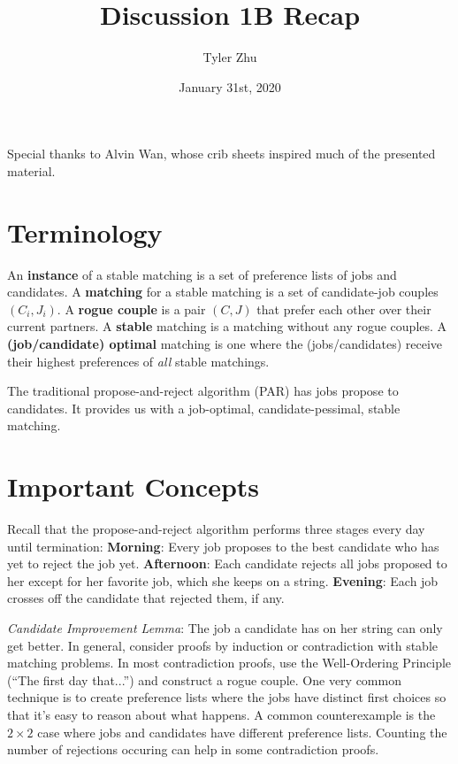 \documentclass[11 pt]{scrartcl}
\newcommand{\hwtitle}{Discussion 1B Recap}
\begin{document}
 
\title{\Large \hwtitle{}}
\author{\large Tyler Zhu}
\date{\large January 31st, 2020}

\maketitle 

Special thanks to Alvin Wan, whose crib sheets inspired much of the presented material.

\section{Terminology}
\itemnum
    \ii An \textbf{instance} of a stable matching is a set of preference lists of jobs and candidates. 
    \ii A \textbf{matching} for a stable matching is a set of candidate-job couples $(C_i, J_i)$. 
    \ii A \textbf{rogue couple} is a pair $(C,J)$ that prefer each other over their current partners. 
    \ii A \textbf{stable} matching is a matching without any rogue couples. 
    \ii A \textbf{(job/candidate) optimal} matching is one where the (jobs/candidates) receive their highest preferences of \emph{all} stable matchings. 
\itemend

The traditional propose-and-reject algorithm (PAR) has jobs propose to candidates. It provides us with a job-optimal, candidate-pessimal, stable matching.  

\section{Important Concepts}
Recall that the propose-and-reject algorithm performs three stages every day until termination: 
\alphanum
    \ii \textbf{Morning}: Every job proposes to the best candidate who has yet to reject the job yet.  
    \ii \textbf{Afternoon}: Each candidate rejects all jobs proposed to her except for her favorite job, which she keeps on a string. 
    \ii \textbf{Evening}: Each job crosses off the candidate that rejected them, if any.
\enumend

\itemnum
    \ii \emph{Candidate Improvement Lemma}: The job a candidate has on her string can only get better. 
    \ii In general, consider proofs by induction or contradiction with stable matching problems. In most contradiction proofs, use the Well-Ordering Principle (``The first day that...'') and construct a rogue couple. 
    \ii One very common technique is to create preference lists where the jobs have distinct first choices so that it's easy to reason about what happens.
    \ii A common counterexample is the $2\times 2$ case where jobs and candidates have different preference lists. 
    \ii Counting the number of rejections occuring can help in some contradiction proofs.
\itemend
\end{document}
